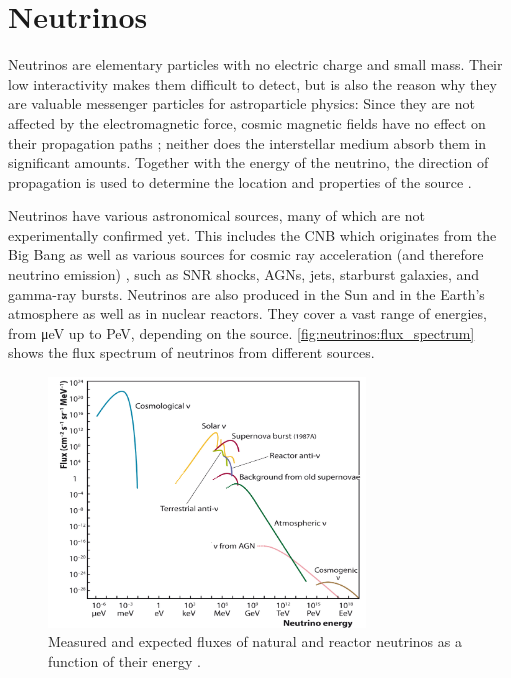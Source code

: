 \section{Neutrinos}

Neutrinos are elementary particles with no electric charge and small mass. %
Their low interactivity
  makes them difficult to detect,
  but is also the reason why they are valuable messenger particles for astroparticle physics:
Since they are not affected by the electromagnetic force,
  cosmic magnetic fields have no effect on their propagation paths \cite{neutrinos_katz};
  neither does the interstellar medium absorb them in significant amounts.
Together with the energy of the neutrino,
  the direction of propagation %
  is used to determine the location and properties of the source \cite{neutrinos_katz}.


Neutrinos have various astronomical sources,
  many of which are not experimentally confirmed yet.
This includes
  the \ac{CNB} \cite{follin2015}
     which originates from the Big Bang
  as well as various sources for cosmic ray acceleration
    (and therefore neutrino emission)
  \cite{neutrinos_aartsen_sources},
  such as
    \ac{SNR} shocks,
    \acp{AGN},
    jets,
    starburst galaxies, %
    and gamma-ray bursts.
Neutrinos are also produced in
  the Sun
  and in the Earth's atmosphere %
  as well as in nuclear reactors.
They cover a vast range of energies, from \si{\micro\electronvolt} up to \si{\peta\electronvolt},
  depending on the source. \citationneeded{}
\autoref{fig:neutrinos:flux_spectrum} shows the flux spectrum of neutrinos from different sources.

\begin{figure}
  \centering
  \includegraphics[width=0.75\textwidth]{content/img/neutrino_spectrum.png}
  \caption{
    Measured and expected fluxes of natural and reactor neutrinos as a function of their energy \cite{spiering2012}.
  }
  \label{fig:neutrinos:flux_spectrum}
\end{figure}


